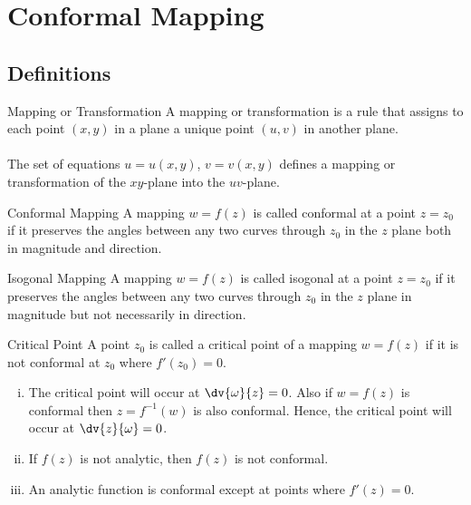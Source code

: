 
\section{Conformal Mapping}
\subsection{Definitions}

\begin{definition}{Mapping or Transformation}{}
    A mapping or transformation is a rule that assigns to each point $(x,y)$ in a plane a unique point $(u,v)$ in another plane. \\~\\

    The set of equations $u = u(x,y)$, $v = v(x,y)$ defines a mapping or transformation of the $xy$-plane into the $uv$-plane.
\end{definition}

\begin{definition}{Conformal Mapping}{}
    A mapping $w = f(z)$ is called conformal at a point $z=z_0$ if it preserves the angles between any two curves through $z_0$ in the $z$ plane both in magnitude and direction.
\end{definition}

\begin{definition}{Isogonal Mapping}{}
    A mapping $w = f(z)$ is called isogonal at a point $z=z_0$ if it preserves the angles between any two curves through $z_0$ in the $z$ plane in magnitude but not necessarily in direction.
\end{definition}

\begin{definition}{Critical Point}{}
    A point $z_0$ is called a critical point of a mapping $w = f(z)$ if it is not conformal at $z_0$ where $f'(z_0)=0$.
    \begin{enumerate}[(i)]
        \item The critical point will occur at $\displaystyle \dv{\omega}{z} = 0$. Also if $w=f(z)$ is conformal then $z=f^{-1}(w)$ is also conformal. Hence, the critical point will occur at $\displaystyle \dv{z}{\omega} = 0$.
        \item If $f(z)$ is not analytic, then $f(z)$ is not conformal.
        \item An analytic function is conformal except at points where $f'(z) = 0$.
    \end{enumerate}
\end{definition}

